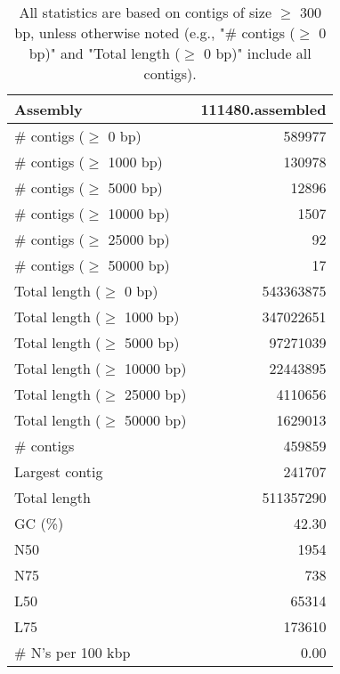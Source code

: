 \documentclass[12pt,a4paper]{article}
\begin{document}
\begin{table}[ht]
\begin{center}
\caption{All statistics are based on contigs of size $\geq$ 300 bp, unless otherwise noted (e.g., "\# contigs ($\geq$ 0 bp)" and "Total length ($\geq$ 0 bp)" include all contigs).}
\begin{tabular}{|l*{1}{|r}|}
\hline
Assembly & 111480.assembled \\ \hline
\# contigs ($\geq$ 0 bp) & 589977 \\ \hline
\# contigs ($\geq$ 1000 bp) & 130978 \\ \hline
\# contigs ($\geq$ 5000 bp) & 12896 \\ \hline
\# contigs ($\geq$ 10000 bp) & 1507 \\ \hline
\# contigs ($\geq$ 25000 bp) & 92 \\ \hline
\# contigs ($\geq$ 50000 bp) & 17 \\ \hline
Total length ($\geq$ 0 bp) & 543363875 \\ \hline
Total length ($\geq$ 1000 bp) & 347022651 \\ \hline
Total length ($\geq$ 5000 bp) & 97271039 \\ \hline
Total length ($\geq$ 10000 bp) & 22443895 \\ \hline
Total length ($\geq$ 25000 bp) & 4110656 \\ \hline
Total length ($\geq$ 50000 bp) & 1629013 \\ \hline
\# contigs & 459859 \\ \hline
Largest contig & 241707 \\ \hline
Total length & 511357290 \\ \hline
GC (\%) & 42.30 \\ \hline
N50 & 1954 \\ \hline
N75 & 738 \\ \hline
L50 & 65314 \\ \hline
L75 & 173610 \\ \hline
\# N's per 100 kbp & 0.00 \\ \hline
\end{tabular}
\end{center}
\end{table}
\end{document}
